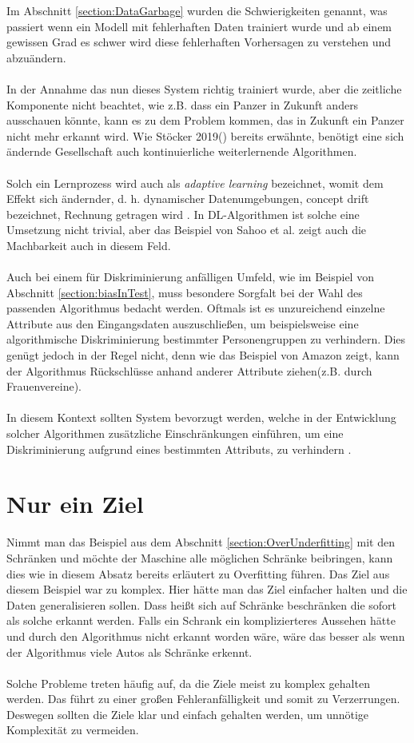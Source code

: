 \documentclass[12pt,oneside,a4paper,parskip]{scrbook}
\begin{document}
Im Abschnitt \ref{section:DataGarbage} wurden die Schwierigkeiten genannt, was passiert wenn ein Modell mit fehlerhaften Daten trainiert wurde und ab einem gewissen Grad es schwer wird diese fehlerhaften Vorhersagen zu verstehen und abzuändern.
\\\\
In der Annahme das nun dieses System richtig trainiert wurde, aber die zeitliche Komponente nicht beachtet, wie z.B. dass ein Panzer in Zukunft anders ausschauen könnte, kann es zu dem Problem kommen, das in Zukunft ein Panzer nicht mehr erkannt wird. Wie Stöcker 2019(\cite{stoecker}) bereits erwähnte, benötigt eine sich ändernde Gesellschaft auch kontinuierliche weiterlernende Algorithmen. 
\\\\
Solch ein Lernprozess wird auch als \textit{adaptive learning} bezeichnet, womit dem Effekt sich ändernder, d. h. dynamischer Datenumgebungen, concept drift bezeichnet, Rechnung getragen wird \cite{gama}. In DL-Algorithmen ist solche eine Umsetzung nicht trivial, aber das Beispiel von Sahoo et al. \cite{sahoo} zeigt auch die Machbarkeit auch in diesem Feld.
\\\\
Auch bei einem für Diskriminierung anfälligen Umfeld, wie im Beispiel von Abschnitt \ref{section:biasInTest}, muss besondere Sorgfalt bei der Wahl des passenden Algorithmus bedacht werden. Oftmals ist es unzureichend einzelne Attribute aus den Eingangsdaten auszuschließen, um beispielsweise eine algorithmische Diskriminierung bestimmter Personengruppen zu verhindern. Dies genügt jedoch in der Regel nicht, denn wie das Beispiel von Amazon zeigt, kann der Algorithmus Rückschlüsse anhand anderer Attribute ziehen(z.B. durch Frauenvereine).
\\\\
In diesem Kontext sollten System bevorzugt werden, welche in der Entwicklung solcher Algorithmen zusätzliche Einschränkungen einführen, um eine Diskriminierung aufgrund eines bestimmten Attributs, zu verhindern \cite{kamiran}.

\section{Nur ein Ziel}
\label{section:oneGoal}
Nimmt man das Beispiel aus dem Abschnitt \ref{section:OverUnderfitting} mit den Schränken und möchte der Maschine alle möglichen Schränke beibringen, kann dies wie in diesem Absatz bereits erläutert zu Overfitting führen. Das Ziel aus diesem Beispiel war zu komplex. Hier hätte man das Ziel einfacher halten und die Daten generalisieren sollen. Dass heißt sich auf Schränke beschränken die sofort als solche erkannt werden. Falls ein Schrank ein komplizierteres Aussehen hätte und durch den Algorithmus nicht erkannt worden wäre, wäre das besser als wenn der Algorithmus viele Autos als Schränke erkennt. 
\\\\
Solche Probleme treten häufig auf, da die Ziele meist zu komplex gehalten werden. Das führt zu einer großen Fehleranfälligkeit und somit zu Verzerrungen. Deswegen sollten die Ziele klar und einfach gehalten werden, um unnötige Komplexität zu vermeiden.
\end{document}
